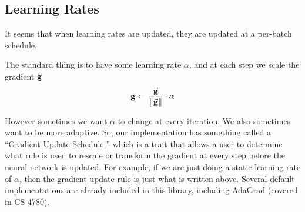 \subsection{Learning Rates}

It seems that when learning rates are updated, they are updated at a per-batch 
schedule.

The standard thing is to have some learning rate $\alpha$, and at each step 
we scale the gradient $\vec{\mathbf{g}}$ 
\[
    \vec{\mathbf{g}} \leftarrow \frac{\vec{\mathbf{g}}}{\|\vec{\mathbf{g}}\|} \cdot \alpha
\]

However sometimes we want $\alpha$ to change at every iteration. 
We also sometimes want to be more adaptive. So, our implementation
has something called a ``Gradient Update Schedule,'' which is a trait that 
allows a user to determine what rule is used to rescale or transform the 
gradient at every step before the neural network is updated. For example,
if we are just doing a static learning rate of $\alpha$, then the 
gradient update rule is just what is written above. Several 
default implementations are already included in this library, including 
AdaGrad (covered in CS 4780).